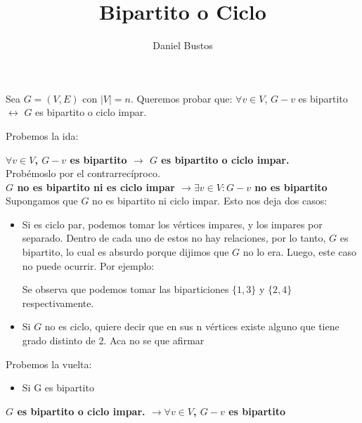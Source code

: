 \documentclass{article}
\title{Bipartito o Ciclo}
\author{Daniel Bustos}
\begin{document}
\maketitle

Sea $G = (V,E)$ con $|V| = n$. Queremos probar que: $\forall v \in V$, $G-v$ es bipartito $\leftrightarrow$ $G$ es bipartito o ciclo impar.

Probemos la ida:

\textbf{$\forall v \in V$, $G-v$ es bipartito $\rightarrow$ $G$ es bipartito o ciclo impar.}\\

Probémoslo por el contrarrecíproco.\\
\textbf{$G$  no es bipartito ni es ciclo impar $\rightarrow \exists v \in V: G-v $ no es bipartito}
Supongamos que $G$ no es bipartito ni ciclo impar. Esto nos deja dos casos:
\begin{itemize}


\item Si es ciclo par, podemos tomar los vértices impares, y los impares por separado. Dentro de cada uno de estos no hay relaciones, por lo tanto, $G$ es bipartito, lo cual es absurdo porque dijimos que $G$ no lo era. Luego, este caso no puede ocurrir. Por ejemplo:

\begin{center}
\end{center}

Se observa que podemos tomar las biparticiones $\{1,3\}$ y $\{2,4\}$ respectivamente.

\item Si $G$ no es ciclo, quiere decir que en sus n vértices existe alguno que tiene grado distinto de 2. Aca no se que afirmar
\end{itemize}
Probemos la vuelta: 
\begin{itemize}

	\item Si G es bipartito

\end{itemize}

\textbf{$G$ es bipartito o ciclo impar. $\rightarrow \forall v \in V$, $G-v$ es bipartito} 
\end{document}
